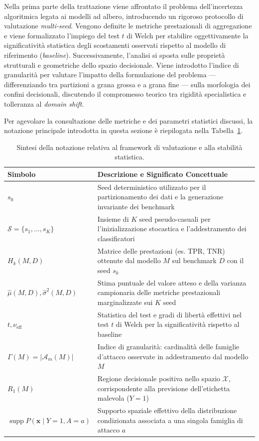 Nella prima parte della trattazione viene affrontato il problema dell'incertezza algoritmica legata ai modelli ad albero, introducendo un rigoroso protocollo di valutazione \textit{multi-seed}. 
Vengono definite le metriche prestazionali di aggregazione e viene formalizzato l'impiego del test $t$ di Welch per stabilire oggettivamente la significatività statistica degli scostamenti osservati rispetto al modello di riferimento (\textit{baseline}). 
Successivamente, l'analisi si sposta sulle proprietà strutturali e geometriche dello spazio decisionale. 
Viene introdotto l'indice di granularità per valutare l'impatto della formulazione del problema — differenziando tra partizioni a grana grossa e a grana fine — sulla morfologia dei confini decisionali, discutendo il compromesso teorico tra rigidità specialistica e tolleranza al \textit{domain shift}.

Per agevolare la consultazione delle metriche e dei parametri statistici discussi, la notazione principale introdotta in questa sezione è riepilogata nella Tabella~\ref{tab:notazione_valutazione}.

\begin{table}[H]
    \centering
    \caption{Sintesi della notazione relativa al framework di valutazione e alla stabilità statistica.}
    \label{tab:notazione_valutazione}
    \begin{tabularx}{\textwidth}{l >{\raggedright\arraybackslash}X }
    \toprule
    \textbf{Simbolo} & \textbf{Descrizione e Significato Concettuale} \\
    \midrule
    $s_0$ &
    Seed deterministico utilizzato per il partizionamento dei dati e la generazione invariante dei benchmark \\
    $\mathcal{S} = \{s_1, \dots, s_K\}$ &
    Insieme di $K$ seed pseudo-casuali per l'inizializzazione stocastica e l'addestramento dei classificatori \\
    $H_k(M, D)$ &
    Matrice delle prestazioni (es. TPR, TNR) ottenute dal modello $M$ sul benchmark $D$ con il seed $s_k$ \\
    $\hat{\mu}(M, D), \hat{\sigma}^2(M, D)$ &
    Stima puntuale del valore atteso e della varianza campionaria delle metriche prestazionali marginalizzate sui $K$ seed \\
    $t, \nu_{\text{eff}}$ &
    Statistica del test e gradi di libertà effettivi nel test $t$ di Welch per la significatività rispetto al baseline \\
    $\Gamma(M) = |\mathcal{A}_m(M)|$ &
    Indice di granularità: cardinalità delle famiglie d'attacco osservate in addestramento dal modello $M$ \\
    $R_1(M)$ &
    Regione decisionale positiva nello spazio $\mathcal{X}$, corrispondente alla previsione dell'etichetta malevola ($Y=1$) \\
    $\operatorname{supp} P(\mathbf{x} \mid Y=1, A=a)$ &
    Supporto spaziale effettivo della distribuzione condizionata associata a una singola famiglia di attacco $a$ \\
    \bottomrule
    \end{tabularx}
\end{table}

